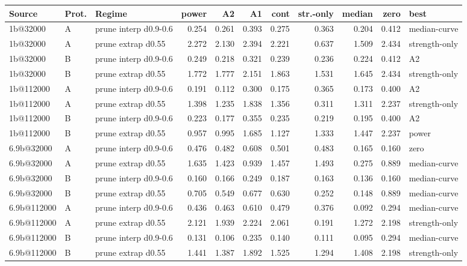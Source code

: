 \begin{table}[t]\centering\scriptsize\setlength{\tabcolsep}{1.6pt}
\begin{tabular}{@{}lllrrrrrrrl@{}}
\toprule
Source & Prot. & Regime & power & A2 & A1 & cont & str.-only & median & zero & best \\
\midrule
1b@32000 & A & prune interp d0.9-0.6 & 0.254 & 0.261 & 0.393 & 0.275 & 0.363 & 0.204 & 0.412 & median-curve \\
1b@32000 & A & prune extrap d0.55 & 2.272 & 2.130 & 2.394 & 2.221 & 0.637 & 1.509 & 2.434 & strength-only \\
1b@32000 & B & prune interp d0.9-0.6 & 0.249 & 0.218 & 0.321 & 0.239 & 0.236 & 0.224 & 0.412 & A2 \\
1b@32000 & B & prune extrap d0.55 & 1.772 & 1.777 & 2.151 & 1.863 & 1.531 & 1.645 & 2.434 & strength-only \\
1b@112000 & A & prune interp d0.9-0.6 & 0.191 & 0.112 & 0.300 & 0.175 & 0.365 & 0.173 & 0.400 & A2 \\
1b@112000 & A & prune extrap d0.55 & 1.398 & 1.235 & 1.838 & 1.356 & 0.311 & 1.311 & 2.237 & strength-only \\
1b@112000 & B & prune interp d0.9-0.6 & 0.223 & 0.177 & 0.355 & 0.235 & 0.219 & 0.195 & 0.400 & A2 \\
1b@112000 & B & prune extrap d0.55 & 0.957 & 0.995 & 1.685 & 1.127 & 1.333 & 1.447 & 2.237 & power \\
6.9b@32000 & A & prune interp d0.9-0.6 & 0.476 & 0.482 & 0.608 & 0.501 & 0.483 & 0.165 & 0.160 & zero \\
6.9b@32000 & A & prune extrap d0.55 & 1.635 & 1.423 & 0.939 & 1.457 & 1.493 & 0.275 & 0.889 & median-curve \\
6.9b@32000 & B & prune interp d0.9-0.6 & 0.160 & 0.166 & 0.249 & 0.187 & 0.163 & 0.136 & 0.160 & median-curve \\
6.9b@32000 & B & prune extrap d0.55 & 0.705 & 0.549 & 0.677 & 0.630 & 0.252 & 0.148 & 0.889 & median-curve \\
6.9b@112000 & A & prune interp d0.9-0.6 & 0.436 & 0.463 & 0.610 & 0.479 & 0.376 & 0.092 & 0.294 & median-curve \\
6.9b@112000 & A & prune extrap d0.55 & 2.121 & 1.939 & 2.224 & 2.061 & 0.191 & 1.272 & 2.198 & strength-only \\
6.9b@112000 & B & prune interp d0.9-0.6 & 0.131 & 0.106 & 0.235 & 0.140 & 0.111 & 0.095 & 0.294 & median-curve \\
6.9b@112000 & B & prune extrap d0.55 & 1.441 & 1.387 & 1.892 & 1.525 & 1.294 & 1.408 & 2.198 & strength-only \\

\end{tabular}
\end{table}
